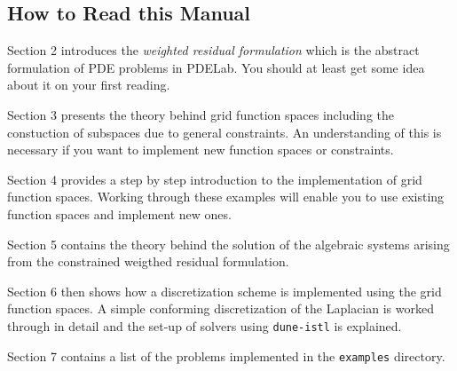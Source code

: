 \subsection{How to Read this Manual}

Section 2 introduces the \textit{weighted residual formulation} which
is the abstract formulation of PDE problems in PDELab. You should at
least get some idea about it on your first reading.

Section 3 presents the theory behind grid function
spaces including the constuction of subspaces due to general
constraints. An understanding of this is necessary if you want to
implement new function spaces or constraints.

Section 4 provides a step by step introduction to the implementation
of grid function spaces. Working through these examples will enable
you to use existing function spaces and implement new ones.

Section 5 contains the theory behind the solution of the algebraic
systems arising from the constrained weigthed residual formulation.

Section 6 then shows how a discretization scheme is implemented using
the grid function spaces. A simple conforming discretization of the
Laplacian is worked through in detail and the set-up of solvers
using \lstinline{dune-istl} is explained.

Section 7 contains a list of the problems implemented in
the \lstinline{examples} directory.

\cleardoublepage
